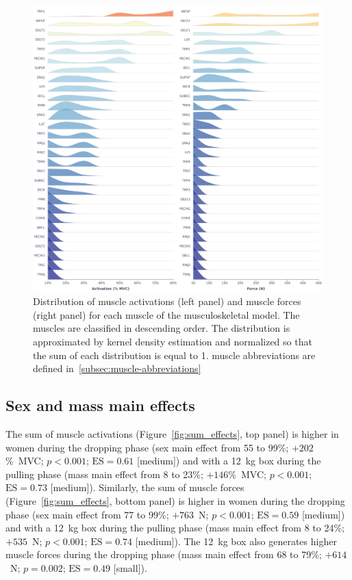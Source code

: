 \begin{figure}[H]
    \centering\includegraphics[width=1\linewidth]{fig/dist.pdf}
    \caption{Distribution of muscle activations (left panel) and muscle forces (right panel) for each muscle of the musculoskeletal model.
    The muscles are classified in descending order.
    The distribution is approximated by kernel density estimation and normalized so that the sum of each distribution is equal to 1.
    muscle abbreviations are defined in~\ref{subsec:muscle-abbreviations}}
    \label{fig:dist}
\end{figure}

\subsection{Sex and mass main effects}\label{subsec:sex-and-mass-main-effects}

The sum of muscle activations (Figure~\ref{fig:sum_effects}, top panel) is higher in women during the dropping phase (sex main effect from 55 to 99\%; $+202$\%~MVC; $p<0.001$; $\textrm{ES} = 0.61$ [medium]) and with a 12~kg box during the pulling phase (mass main effect from 8 to 23\%; $+146$\%~MVC; $p<0.001$; $\textrm{ES} = 0.73$ [medium]).
Similarly, the sum of muscle forces (Figure~\ref{fig:sum_effects}, bottom panel) is higher in women during the dropping phase (sex main effect from 77 to 99\%; $+763$~N; $p<0.001$; $\textrm{ES} = 0.59$ [medium]) and with a 12~kg box during the pulling phase (mass main effect from 8 to 24\%; $+535$~N; $p<0.001$; $\textrm{ES} = 0.74$ [medium]).
The 12~kg box also generates higher muscle forces during the dropping phase (mass main effect from 68 to 79\%; $+614$~N; $p = 0.002$; $\textrm{ES} = 0.49$ [small]).

